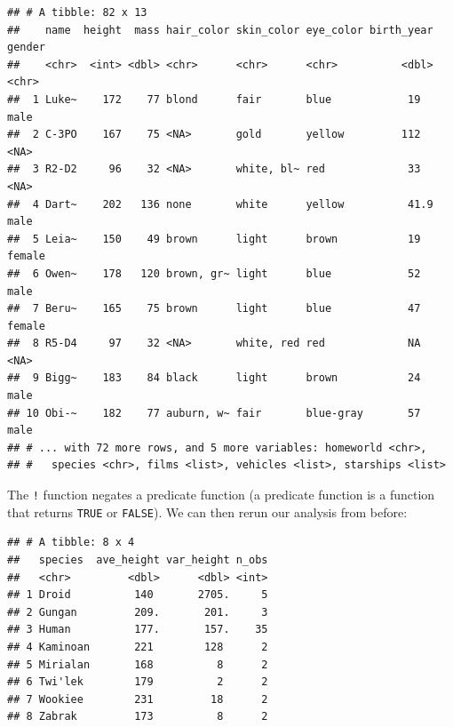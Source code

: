 \documentclass[]{gitbook}
\newenvironment{Shaded}{\begin{snugshade}}{\end{snugshade}}
\newcommand{\DataTypeTok}[1]{\textcolor[rgb]{0.13,0.29,0.53}{#1}}
\newcommand{\DecValTok}[1]{\textcolor[rgb]{0.00,0.00,0.81}{#1}}
\newcommand{\KeywordTok}[1]{\textcolor[rgb]{0.13,0.29,0.53}{\textbf{#1}}}
\newcommand{\NormalTok}[1]{#1}
\newcommand{\OperatorTok}[1]{\textcolor[rgb]{0.81,0.36,0.00}{\textbf{#1}}}
\newcommand{\OtherTok}[1]{\textcolor[rgb]{0.56,0.35,0.01}{#1}}
\newcommand{\StringTok}[1]{\textcolor[rgb]{0.31,0.60,0.02}{#1}}
\theoremstyle{definition}
\theoremstyle{definition}
\theoremstyle{definition}
\theoremstyle{remark}
\begin{document}
\begin{verbatim}
## # A tibble: 82 x 13
##    name  height  mass hair_color skin_color eye_color birth_year gender
##    <chr>  <int> <dbl> <chr>      <chr>      <chr>          <dbl> <chr> 
##  1 Luke~    172    77 blond      fair       blue            19   male  
##  2 C-3PO    167    75 <NA>       gold       yellow         112   <NA>  
##  3 R2-D2     96    32 <NA>       white, bl~ red             33   <NA>  
##  4 Dart~    202   136 none       white      yellow          41.9 male  
##  5 Leia~    150    49 brown      light      brown           19   female
##  6 Owen~    178   120 brown, gr~ light      blue            52   male  
##  7 Beru~    165    75 brown      light      blue            47   female
##  8 R5-D4     97    32 <NA>       white, red red             NA   <NA>  
##  9 Bigg~    183    84 black      light      brown           24   male  
## 10 Obi-~    182    77 auburn, w~ fair       blue-gray       57   male  
## # ... with 72 more rows, and 5 more variables: homeworld <chr>,
## #   species <chr>, films <list>, vehicles <list>, starships <list>
\end{verbatim}

The \texttt{!} function negates a predicate function (a predicate
function is a function that returns \texttt{TRUE} or \texttt{FALSE}). We
can then rerun our analysis from before:

\begin{Shaded}
\end{Shaded}

\begin{verbatim}
## # A tibble: 8 x 4
##   species  ave_height var_height n_obs
##   <chr>         <dbl>      <dbl> <int>
## 1 Droid          140       2705.     5
## 2 Gungan         209.       201.     3
## 3 Human          177.       157.    35
## 4 Kaminoan       221        128      2
## 5 Mirialan       168          8      2
## 6 Twi'lek        179          2      2
## 7 Wookiee        231         18      2
## 8 Zabrak         173          8      2
\end{verbatim}
\end{document}
